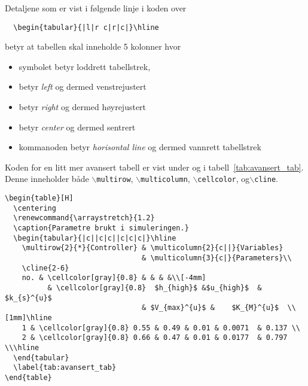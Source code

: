 Detaljene som er vist i følgende linje i koden over

\begin{boxedminipage}{\textwidth}
\begin{verbatim}
  \begin{tabular}{|l|r c|r|c|}\hline
\end{verbatim}
\end{boxedminipage}

betyr at tabellen skal inneholde 5 kolonner hvor
\begin{itemize}
\item  symbolet \fbox{|} betyr loddrett tabellstrek, 
\item {} betyr {\em left} og dermed venstrejustert
\item {} betyr {\em right} og dermed høyrejustert
\item {} betyr {\em center} og dermed sentrert
\item kommanoden  betyr {\em horisontal
    line} og dermed vannrett tabellstrek
\end{itemize}

\newpage

Koden for en litt mer avansert tabell er vist under og i 
tabell~\ref{tab:avansert_tab}. Denne inneholder både 
{\tt $\backslash$multirow}, 
{\tt $\backslash$multicolumn}, 
{\tt $\backslash$cellcolor}, 
 og{\tt $\backslash$cline}. 

\begin{boxedminipage}{160mm}
\begin{verbatim}
\begin{table}[H]
  \centering
  \renewcommand{\arraystretch}{1.2}
  \caption{Parametre brukt i simuleringen.}
  \begin{tabular}{|c||c|c||c|c|c|}\hline
    \multirow{2}{*}{Controller} & \multicolumn{2}{c||}{Variables} 
                                & \multicolumn{3}{c|}{Parameters}\\
    \cline{2-6}
    no. & \cellcolor[gray]{0.8} & & & &\\[-4mm]
          & \cellcolor[gray]{0.8}  $h_{high}$ &$u_{high}$  & $k_{s}^{u}$  
                                & $V_{max}^{u}$ &    $K_{M}^{u}$  \\[1mm]\hline
    1 & \cellcolor[gray]{0.8} 0.55 & 0.49 & 0.01 & 0.0071  & 0.137 \\
    2 & \cellcolor[gray]{0.8} 0.66 & 0.47 & 0.01 & 0.0177  & 0.797 \\\hline
  \end{tabular}
  \label{tab:avansert_tab}
\end{table}
\end{verbatim}
\end{boxedminipage}

